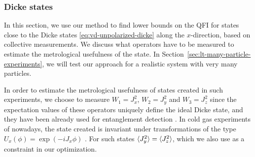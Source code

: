 \subsubsection{Dicke states}
\label{sec:lt-bound-dicke-states}

In this section, we use our method to find lower bounds on the QFI for states close to the Dicke states \eqref{eq:vd-unpolarized-dicke} along the $x$-direction, based on collective measurements.
We discuss what operators have to be measured to estimate the metrological usefulness of the state.
In Section~\ref{sec:lt-many-particle-experiments}, we will test our approach for a realistic system with very many particles.

In order to estimate the metrological usefulness of states created in such experiments, we choose to measure $W_1=J_x^2$, $W_2=J_y^2$ and $W_3=J_z^2$ since the expectation values of these operators uniquely define the ideal Dicke state, and they have been already used for entanglement detection \cite{Luecke2014}.
In cold gas experiments of nowadays, the state created is invariant under transformations of the type $U_{x}(\phi)=\exp(-i J_x \phi)$ \cite{Apellaniz2015}.
For such states $\langle{J_y^2}\rangle=\langle{J_z^2}\rangle$, which we also use as a constraint in our optimization.

